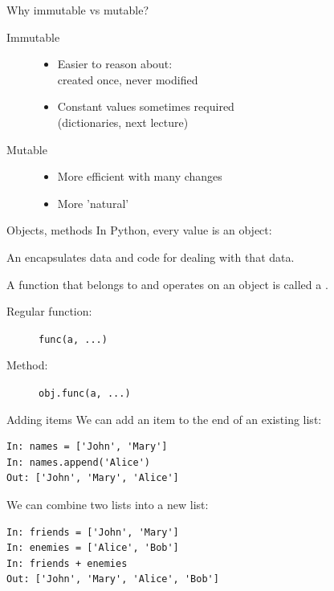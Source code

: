 \documentclass[aspectratio=169,usenames,dvipsnames]{beamer}
\begin{document}
\begin{frame}{Why immutable vs mutable?}
    \begin{description}
        \item[Immutable]
            \begin{itemize}
                \item Easier to reason about:\\
                    created once, never modified
                \item Constant values sometimes required\\
                    (dictionaries, next lecture)
            \end{itemize}

        \item[Mutable]
            \begin{itemize}
                \item More efficient with many changes
                \item More 'natural'
            \end{itemize}
    \end{description}
\end{frame}

\begin{frame}{Objects, methods}
    In Python, every value is an object:

    \begin{definition}
        An  encapsulates
        data and code for dealing with that data.

        A function that belongs to and operates on an object
        is called a .
    \end{definition}
   
    \begin{description}
        \item[Regular function:] \texttt{func(a, ...)}
        \item[Method:] \texttt{obj.func(a, ...)}
    \end{description}
\end{frame}

\begin{frame}[fragile]{Adding items}
We can add an item to the end of an existing list:
\begin{lstlisting} 
In: names = ['John', 'Mary']
In: names.append('Alice')
Out: ['John', 'Mary', 'Alice']
\end{lstlisting}

\pause
We can combine two lists into a new list:
\begin{lstlisting} 
In: friends = ['John', 'Mary']
In: enemies = ['Alice', 'Bob']
In: friends + enemies
Out: ['John', 'Mary', 'Alice', 'Bob']
\end{lstlisting}
\end{frame}
\end{document}
